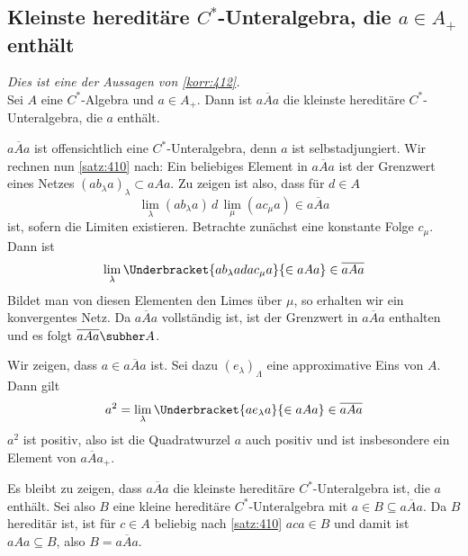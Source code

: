\subsection{Kleinste hereditäre $C^*$-Unteralgebra, die $a \in A_+$ enthält} %
\label{sub:her_kleinste}
\emph{Dies ist eine der Aussagen von \autoref{korr:412}.}\smallskip\\
Sei $A$ eine $C^*$-Algebra und $a \in  A_+$.
Dann ist $\overline{aAa}$ die kleinste hereditäre $C^*$-Unteralgebra, die $a$ enthält.
\begin{beweis}
	$\overline{aAa}$ ist offensichtlich eine $C^*$-Unteralgebra, denn $a$ ist selbstadjungiert.
	Wir rechnen nun \autoref{satz:410} nach:
	Ein beliebiges Element in $\overline{aAa}$ ist der Grenzwert eines Netzes $(ab_\lambda a)_\lambda \subset aAa$.
	Zu zeigen ist also, dass für $d \in A$
	\[
		\lim_\lambda(ab_\lambda a)\, d \,\lim_{\mu} (a c_\mu a) \in \overline{aAa}
	\]
	ist, sofern die Limiten existieren.
	Betrachte zunächst eine konstante Folge $c_\mu$.
	Dann ist 
	\[
		\lim_\lambda \Underbracket{a b_\lambda a d a c_\mu a}{\in aAa} \in \overline{aAa}
	\]
	Bildet man von diesen Elementen den Limes über $\mu$, so erhalten wir ein konvergentes Netz.
	Da $\overline{a A a}$ vollständig ist, ist der Grenzwert in $\overline{aAa}$ enthalten und es folgt $\overline{a A a}\subher A$.
	
	Wir zeigen, dass $a \in \overline{aAa}$ ist.
	Sei dazu $(e_\lambda)_\Lambda$ eine approximative Eins von $A$.
	Dann gilt
	\[
		a^2 = \lim_\lambda \Underbracket{a e_\lambda a}{\in aAa} \in \overline{a A a}
	\]
	$a^2$ ist positiv, also ist die Quadratwurzel $a$ auch positiv und ist insbesondere ein Element von $\overline{a Aa}_+$.
	
	Es bleibt zu zeigen, dass $\overline{a A a}$ die kleinste hereditäre $C^*$-Unteralgebra ist, die $a$ enthält.
	Sei also $B$ eine kleine hereditäre $C^*$-Unteralgebra mit $a \in B \subseteq \overline{aAa}$.
	Da $B$ hereditär ist, ist für $c \in A$ beliebig nach \autoref{satz:410} $aca \in B$ und damit ist $a A a \subseteq B$, also $B=\overline{aAa}$.
\end{beweis}


